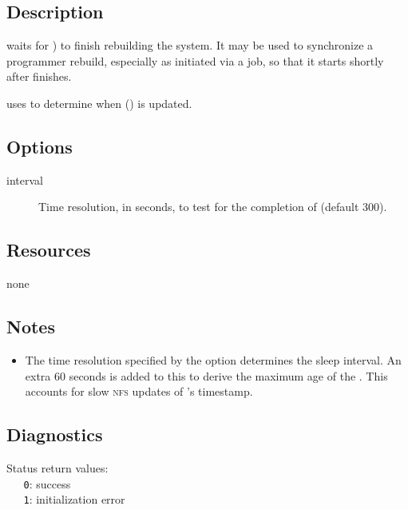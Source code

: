 \subsection*{Description}

 waits for ) to finish rebuilding the system.  It
may be used to synchronize a programmer rebuild, especially as initiated via a
 job, so that it starts shortly after  finishes.

 uses  to determine when 
() is updated.
 
\subsection*{Options}
 
\begin{description}
\item[ interval]
   Time resolution, in seconds, to test for the completion of 
   (default 300).

\end{description}
 
\subsection*{Resources}
 
none

\subsection*{Notes}
 
\begin{itemize}
\item
   The time resolution specified by the  option determines the sleep
   interval.  An extra 60 seconds is added to this to derive the maximum age
   of the .  This accounts for slow \textsc{nfs} updates of
   's timestamp.
\end{itemize}

\subsection*{Diagnostics}
 
Status return values:
\\ \verb+   0+: success
\\ \verb+   1+: initialization error
 
